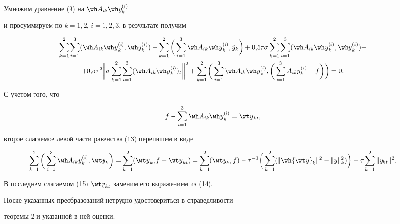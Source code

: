 \begin{pf}


Умножим уравнение (9) на ${\wh A}_{ik}{\wh y}_{k}^{(i)}$


и просуммируем по $k=1, 2$, $i=1, 2, 3$, в результате получим


\begin{multline}


\sum_{k=1}^2 \sum_{i=1}^3 ({\wh A}_{ik}{\wh y}_{k}^{(i)},


{\wh y}^{(i)}_k) - \sum_{k=1}^2 \bigg(\sum_{i=1}^3 {\wh


A}_{ik}{\wh y}_{k}^{(i)},


{\tilde y}_k\bigg)+0{,}5 \tau \sigma \sum_{k=1}^2 \sum_{i=1}^3


({\wh A}_{ik}{\wh y}_{k}^{(i)},{\wh y}^{(i)}_k)+ \\


%


+0{,}5\tau^2 \bigg\|\sigma \sum_{k=1}^2


\sum_{i=1}^3 ({\wh A}_{ik}{\wh y}_{k}^{(i)})_t\bigg\|^2 +


\sum_{k=1}^2 \bigg(\sum_{i=1}^3 {\wh A}_{ik}{\wh y}_{k}^{(i)},


\bigg(\sum_{i=1}^3 {A}_{ik}{y}_{k}^{(i)}-f\bigg)\bigg)=0.


\end{multline}


С учетом того, что


\begin{equation}


f-\sum_{i=1}^3 {\wh A}_{ik}{\wh y}_{k}^{(i)}={\wt y}_{k t},


\end{equation}


второе слагаемое левой части равенства (13) перепишем в виде


\begin{equation}


\sum_{k=1}^2 \bigg(\sum_{i=1}^3 {\wh A}_{ik}{y}_{k}^{(i)},


{\wt y}_k\bigg)=\sum_{k=1}^2({\wt y}_{k}, f-{\wt y}_{k t}) =


\sum_{k=1}^2({\wt y}_{k}, f)-\tau^{-1}


\bigg(\sum_{k=1}^2(\|{\wh {\wt y}}_{k}\|^2 - \|y\|_k^2)\bigg)-


\tau \sum_{k=1}^2 \| y_{k t}\|^2.


\end{equation}


В последнем слагаемом (15) ${\wt y}_{k t}$ заменим его выражением из (14).


После указанных преобразований нетрудно удостовериться в справедливости


теоремы 2 и указанной в ней оценки.


\end{pf}






